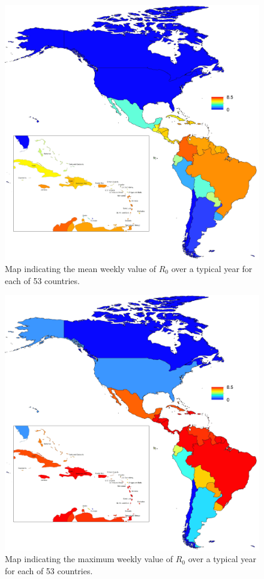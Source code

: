 \documentclass[11pt]{article}
\begin{document}
\newpage
\begin{figure}[!ht]
\begin{center}
\includegraphics[scale=0.8]{../output/meanr0.jpg}
\end{center}
\caption{
Map indicating the mean weekly value of $R_0$ over a typical year for each of 53 countries.
}
\end{figure}


\newpage
\begin{figure}[!ht]
\begin{center}
\includegraphics[scale=0.8]{../output/maxr0.jpg}
\end{center}
\caption{
Map indicating the maximum weekly value of $R_0$ over a typical year for each of 53 countries.
}
\end{figure}
\end{document}

